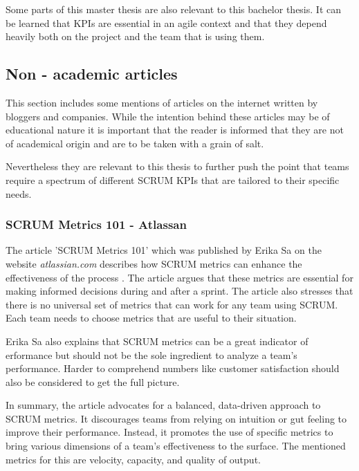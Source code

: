 Some parts of this master thesis are also relevant to this bachelor thesis.
It can be learned that KPIs are essential in an agile context and that they depend 
heavily both on the project and the team that is using them.

\subsection{Non - academic articles}

This section includes some mentions of articles on the internet written by bloggers and companies.
While the intention behind these articles may be of educational nature it is important that the reader
is informed that they are not of academical origin and are to be taken with a grain of salt.

Nevertheless they are relevant to this thesis to further push the point that teams require a spectrum of different 
SCRUM KPIs that are tailored to their specific needs.

\subsubsection*{SCRUM Metrics 101 - Atlassan}

The article 'SCRUM Metrics 101' which was published by Erika Sa on the website 
\textit{atlassian.com} describes how SCRUM metrics can enhance the 
effectiveness of the process \parencite{Atlassian2023}. 
The article argues that these metrics are essential for making informed 
decisions during and after a sprint. 
The article also stresses that there is no universal set of 
metrics that can work for any team using SCRUM. 
Each team needs to choose metrics that are useful to their situation. 

Erika Sa also explains that SCRUM metrics can be a great indicator of 
erformance but should not be the sole ingredient to analyze a team's performance. 
Harder to comprehend numbers like customer satisfaction should also be considered to
get the full picture.

In summary, the article advocates for a balanced,
data-driven approach to SCRUM metrics. 
It discourages teams from relying on intuition or gut 
feeling to improve their performance. 
Instead, it promotes the use of specific metrics to 
bring various dimensions of a team's 
effectiveness to the surface. The mentioned metrics for 
this are velocity, capacity, and quality of output.

